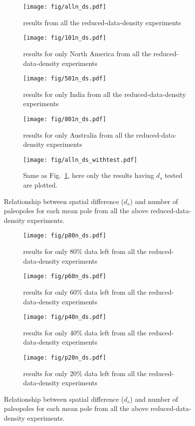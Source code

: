 \begin{figure}
	\centering
	\begin{subfigure}{.49\textwidth}
		\texttt{[image: fig/alln\_ds.pdf]}
		\caption{results from all the reduced-data-density
		experiments}\label{fig-n_ds01}
	\end{subfigure}
	\begin{subfigure}{.49\textwidth}
		\texttt{[image: fig/101n\_ds.pdf]}
		\caption{results for only North America from all the reduced-data-density experiments}
	\end{subfigure}
	\begin{subfigure}{.49\textwidth}
		\texttt{[image: fig/501n\_ds.pdf]}
		\caption{results for only India from all the reduced-data-density experiments}
	\end{subfigure}
	\begin{subfigure}{.49\textwidth}
		\texttt{[image: fig/801n\_ds.pdf]}
		\caption{results for only Australia from all the reduced-data-density experiments}
	\end{subfigure}
	\begin{subfigure}{.49\textwidth}
		\texttt{[image: fig/alln\_ds\_withtest.pdf]}
		\caption{Same as Fig.~\ref{fig-n_ds01}, here only the results having
		$d_s$ tested are plotted.}
	\end{subfigure}
	\caption[ ]{Relationship between spatial difference ($d_s$) and number of
	paleopoles for each mean pole from all the above reduced-data-density
	experiments.}\label{fig-n_ds}
\end{figure}

\begin{figure}
	\centering
	\begin{subfigure}{.49\textwidth}
		\texttt{[image: fig/p80n\_ds.pdf]}
		\caption{results for only 80\% data left from all the reduced-data-density experiments}
	\end{subfigure}
	\begin{subfigure}{.49\textwidth}
		\texttt{[image: fig/p60n\_ds.pdf]}
		\caption{results for only 60\% data left from all the reduced-data-density experiments}
	\end{subfigure}
	\begin{subfigure}{.49\textwidth}
		\texttt{[image: fig/p40n\_ds.pdf]}
		\caption{results for only 40\% data left from all the reduced-data-density experiments}
	\end{subfigure}
	\begin{subfigure}{.49\textwidth}
		\texttt{[image: fig/p20n\_ds.pdf]}
		\caption{results for only 20\% data left from all the reduced-data-density experiments}
	\end{subfigure}
	\caption[ ]{Relationship between spatial difference ($d_s$) and number of
	paleopoles for each mean pole from all the above reduced-data-density
	experiments.}\label{fig-n_ds2}
\end{figure}

